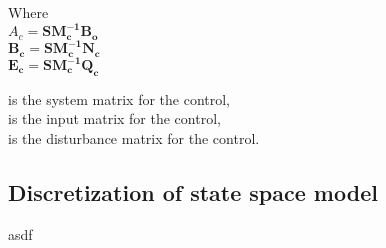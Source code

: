 \begin{minipage}[t]{0.40\textwidth}
Where\\
\hspace*{8mm} $A_c = \pmb{S}\pmb{M_c^{-1}}\pmb{B_o} $ \\
\hspace*{8mm} $\pmb{B_c} = \pmb{S}\pmb{M_c^{-1}}\pmb{N_c} $ \\
\hspace*{8mm} $\pmb{E_c} = \pmb{S}\pmb{M_c^{-1}}\pmb{Q_c} $
\end{minipage}
\begin{minipage}[t]{0.48\textwidth}
\vspace*{1mm}
is the system matrix for the control, \\
is the input matrix for the control, \\
is the disturbance matrix for the control.
\end{minipage} 

\subsection{Discretization of state space model}
 \label{discrete_SS}
 
 asdf
